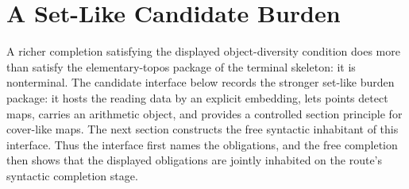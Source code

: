 \documentclass[11pt]{article}
\begin{document}
\begin{code}
\\
%
\>[2]\AgdaSymbol{;}\AgdaSpace{}%
\AgdaSpace{}%
\AgdaSymbol{=}\AgdaSpace{}%
\<%
\\
%
\>[2]\AgdaSymbol{\}}\AgdaSpace{}%
\AgdaSymbol{=}\AgdaSpace{}%
\AgdaSpace{}%
\<%
\\
%
\\[\AgdaEmptyExtraSkip]%
\>[0]\<%
\\
\>[0]\AgdaSpace{}%
\AgdaSymbol{:}\<%
\\
\>[0][@{}l@{\AgdaIndent{0}}]%
\>[2]\AgdaSpace{}%
\AgdaSymbol{(}\AgdaSpace{}%
\AgdaSymbol{)}\AgdaSpace{}%
\AgdaSpace{}%
\<%
\\
\>[0]\AgdaSpace{}%
\AgdaSymbol{=}\AgdaSpace{}%
\<%
\end{code}

\section{A Set-Like Candidate Burden}

A richer completion satisfying the displayed object-diversity condition
does more than satisfy the elementary-topos package of the terminal
skeleton: it is nonterminal.  The candidate interface below records the
stronger set-like burden package: it hosts the reading data by an
explicit embedding, lets points detect maps, carries an arithmetic
object, and provides a controlled section principle for cover-like maps.
The next section constructs the free syntactic inhabitant of this
interface.  Thus the interface first names the obligations, and the free
completion then shows that the displayed obligations are jointly
inhabited on the route's syntactic completion stage.
\end{document}
